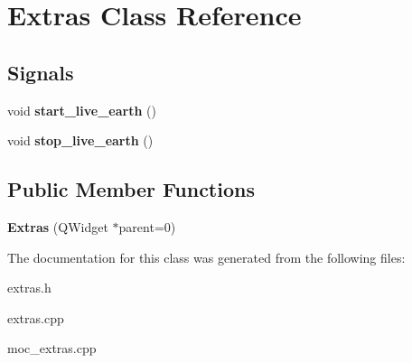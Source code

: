 \hypertarget{classExtras}{
\section{Extras Class Reference}
\label{classExtras}
}
\subsection*{Signals}
\begin{DoxyCompactItemize}
\item 
\hypertarget{classExtras_a0f662eb3d01932eb602b021add0951a0}{
void {\bfseries start\_\-live\_\-earth} ()}
\label{classExtras_a0f662eb3d01932eb602b021add0951a0}

\item 
\hypertarget{classExtras_a7b9c6ee6b1f93b43eae14f399554d68d}{
void {\bfseries stop\_\-live\_\-earth} ()}
\label{classExtras_a7b9c6ee6b1f93b43eae14f399554d68d}

\end{DoxyCompactItemize}
\subsection*{Public Member Functions}
\begin{DoxyCompactItemize}
\item 
\hypertarget{classExtras_ac0a6027f472204fc979ae9a6f1351c3c}{
{\bfseries Extras} (QWidget $\ast$parent=0)}
\label{classExtras_ac0a6027f472204fc979ae9a6f1351c3c}

\end{DoxyCompactItemize}


The documentation for this class was generated from the following files:\begin{DoxyCompactItemize}
\item 
extras.h\item 
extras.cpp\item 
moc\_\-extras.cpp\end{DoxyCompactItemize}

